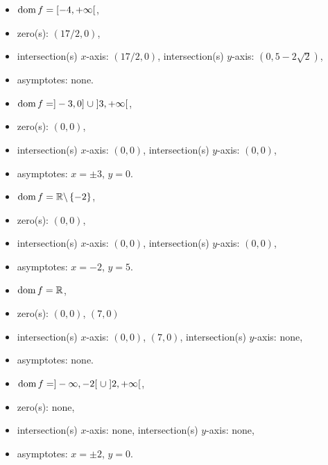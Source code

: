 \begin{Answer}\phantom{}
    
    \Question 
    \begin{itemize}
	    \item $\text{dom}{\,} f= [-4, + \infty[$,
	    \item zero(s): $(17/2,0)$,
	    \item intersection(s) $x$-axis:   $(17/2,0)$, \; intersection(s) $y$-axis:  $(0,5-2\sqrt{2})$,
	    \item asymptotes: none.
	    \end{itemize} 
    \Question 
    \begin{itemize}
	    \item $\text{dom}{\,} f= ]-3,0] \; \cup \; ]3, + \infty[$,
	    \item zero(s): $(0,0)$,
	    \item intersection(s) $x$-axis:   $(0,0)$, \; intersection(s) $y$-axis:  $(0,0)$,
	    \item asymptotes: $x=\pm 3$, $y=0$.
	    \end{itemize} 
    \Question 
    \begin{itemize}
	    \item $\text{dom}{\,} f= \mathbb{R}\backslash \left\{-2\right\}$,
	    \item zero(s): $(0,0)$,
	    \item intersection(s) $x$-axis:   $(0,0)$, \; intersection(s) $y$-axis:  $(0,0)$,
	    \item asymptotes: $x=-2$, $y=5$.
	    \end{itemize} 
    \Question 
      \begin{itemize}
	    \item $\text{dom}{\,} f= \mathbb{R}$,
	    \item zero(s): $(0,0)$, $(7,0)$
	    \item intersection(s) $x$-axis:   $(0,0)$, $(7,0)$, \; intersection(s) $y$-axis:  none,
	    \item asymptotes: none.
	    \end{itemize} 
    \Question 
	    \begin{itemize}
	    \item $\text{dom}{\,} f= ]-\infty,-2[ \; \cup \; ]2, + \infty[$,
	    \item zero(s): none,
	    \item intersection(s) $x$-axis:  none, \; intersection(s) $y$-axis: none,
	    \item asymptotes: $x=\pm 2$, $y=0$.
	    \end{itemize}

\end{Answer}
